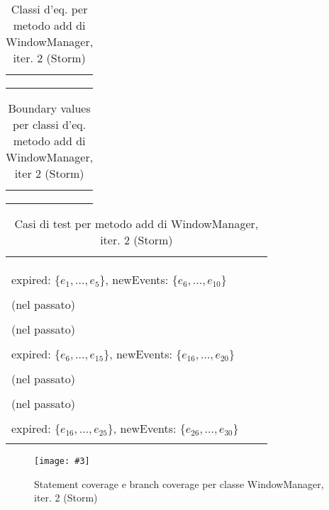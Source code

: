 \documentclass[10pt, a4paper]{article}
\newcommand{\Intmaketable}[4]{
	\begin{longtable}{#3}
	#4
	\caption{#2}
	\label{#1}
	\end{longtable}
}
\newcommand{\Intceqtable}[3]{
	\Intmaketable{#1}{#2}{|l|l|}{
	\hline
	\thead{Parametro formale} & \thead{Classi d'equivalenza} \\
	\hline
	\hline
	#3
	\hline}
}
\newcommand{\Intbvtable}[3]{
	\Intmaketable{#1}{#2}{|l|l|l|}{
	\hline
	\thead{Parametro formale} & \thead{Classe d'equivalenza} & \thead{Boundary value}\\
	\hline
	\hline
	#3
	\hline}
}
\newcommand{\Inttestctable}[3]{
	\Intmaketable{#1}{#2}{|l|l|l|}{
	\hline
	\thead{Input} & \thead{Esito atteso} & \thead{Motivazione}\\
	\hline
	\hline
	#3
	\hline}
}
\newcommand{\Intceqcaption}[4]{Classi d'eq. per metodo #1 di #2, iter. #3 (#4)}
\newcommand{\Intbvcaption}[4]{Boundary values per classi d'eq. metodo #1 di #2, iter #3 (#4)}
\newcommand{\Inttestccaption}[4]{Casi di test per metodo #1 di #2, iter. #3 (#4)}
\newcommand{\gettablelabel}[5]{table:#1:#2:#3:iter#4:proj#5}
\newcommand{\ceqtable}[5]{
	\Intceqtable{\gettablelabel{ceq}{#1}{#2}{#3}{#4}}
		{\Intceqcaption{#1}{#2}{#3}{#4}}
		{#5}
}
\newcommand{\bvtable}[5]{
	\Intbvtable{\gettablelabel{bv}{#1}{#2}{#3}{#4}}
		{\Intbvcaption{#1}{#2}{#3}{#4}}
		{#5}
}
\newcommand{\testctable}[5]{
	\Inttestctable{\gettablelabel{testc}{#1}{#2}{#3}{#4}}
		{\Inttestccaption{#1}{#2}{#3}{#4}}
		{#5}
}
\newcommand{\getpicturelabel}[1]{picture:#1}
\newcommand{\makepicture}[4]{
	\begin{figure}[H]
	\centering
	\texttt{[image: \#3]}
	\caption{#4}
	\label{\getpicturelabel{#3}}
	\end{figure}
}
\newcommand{\classcfcovcaption}[3]{Statement coverage e branch coverage per classe #1, iter. #2 (#3)}
\newcommand{\tcell}{\makecell[tl]}
\newcommand{\newtrow}{\\ \hline}
\def\storm{Storm}
\newcommand{\ceq}[1]{\{#1\}}
\begin{document}
	\ceqtable{add}{WindowManager}{2}{\storm}{
			\tcell{event} &
			\tcell{\ceq{qualsiasi evento di tipo T=Integer}}
		\newtrow
			\tcell{ts} &
			\tcell{\ceq{timestamp $\ge 0$}}
		\newtrow
	}
	
	\bvtable{add}{WindowManager}{2}{\storm}{
			\tcell{event} &
			\tcell{\ceq{qualsiasi evento di tipo T=Integer}} &
			\tcell{Integer.valueOf(0)}
		\newtrow
			\tcell{ts} &
			\tcell{\ceq{timestamp $\ge 0$}} &
			\tcell{0}
		\newtrow
	}
	
	\testctable{add}{WindowManager}{2}{\storm}{
			\tcell{prng(), sctm()} &
			\tcell{Nessuna invocazione del lifecycle listener} &
			\tcell{Add preceduta da 0 altre add}
		\newtrow
			\tcell{prng(), sctm()} &
			\tcell{Nessuna invocazione del lifecycle listener} &
			\tcell{Add preceduta da 5 altre add}
		\newtrow
			\tcell{prng(), sctm()} &
			\tcell{
					Invocazione di 1 volta del lifecycle listener\\
					expired: $\{e_1,\dots,e_5\}$, newEvents: $\{e_6,\dots,e_{10}\}$} &
			\tcell{Add preceduta da 9 altre add}
		\newtrow
			\tcell{prng(), sctm()} &
			\tcell{
					Invocazione di 1 volta del lifecycle listener\\
					(nel passato)} &
			\tcell{Add preceduta da 10 altre add}
		\newtrow
			\tcell{prng(), sctm()} &
			\tcell{
					Invocazione di 1 volta del lifecycle listener\\
					(nel passato)} &
			\tcell{Add preceduta da 15 altre add}
		\newtrow
			\tcell{prng(), sctm()} &
			\tcell{
					Invocazione di 2 volte del lifecycle listener\\
					expired: $\{e_6,\dots,e_{15}\}$, newEvents: $\{e_{16},\dots,e_{20}\}$} &
			\tcell{Add preceduta da 19 altre add}
		\newtrow
			\tcell{prng(), sctm()} &
			\tcell{
					Invocazione di 2 volte del lifecycle listener\\
					(nel passato)} &
			\tcell{Add preceduta da 20 altre add}
		\newtrow
			\tcell{prng(), sctm()} &
			\tcell{
					Invocazione di 2 volte del lifecycle listener\\
					(nel passato)} &
			\tcell{Add preceduta da 25 altre add}
		\newtrow
			\tcell{prng(), sctm()} &
			\tcell{
					Invocazione di 3 volte del lifecycle listener\\
					expired: $\{e_{16},\dots,e_{25}\}$, newEvents: $\{e_{26},\dots,e_{30}\}$} &
			\tcell{Add preceduta da 29 altre add}
		\newtrow
	}
	
	\makepicture{17.5cm}{0.75cm}{storm/controlflow-WindowManager-2}
				{\classcfcovcaption{WindowManager}{2}{\storm}}
				
\end{document}
